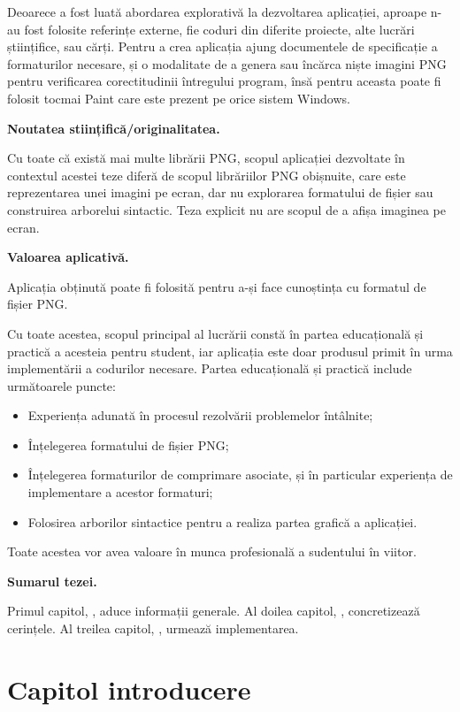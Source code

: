 \documentclass[a4paper,12pt]{report}
\begin{document}
Deoarece a fost luată abordarea explorativă la dezvoltarea aplicației,
aproape n-au fost folosite referințe externe,
fie coduri din diferite proiecte, alte lucrări științifice, sau cărți.
Pentru a crea aplicația ajung documentele de specificație a formaturilor necesare,
și o modalitate de a genera sau încărca niște imagini \ac{PNG}
pentru verificarea corectitudinii întregului program,
însă pentru aceasta poate fi folosit tocmai Paint care este prezent pe orice sistem Windows.

\textbf{Noutatea stiințifică/originalitatea.}

Cu toate că există mai multe librării \ac{PNG},
scopul aplicației dezvoltate în contextul acestei teze diferă de scopul librăriilor \ac{PNG} obișnuite,
care este reprezentarea unei imagini pe ecran,
dar nu explorarea formatului de fișier sau construirea arborelui sintactic.
Teza explicit nu are scopul de a afișa imaginea pe ecran.

\textbf{Valoarea aplicativă.}

Aplicația obținută poate fi folosită pentru a-și face cunoștința cu formatul de fișier \ac{PNG}.

Cu toate acestea, scopul principal al lucrării constă
în partea educațională și practică a acesteia pentru student,
iar aplicația este doar produsul primit în urma implementării a codurilor necesare.
Partea educațională și practică include următoarele puncte:
\begin{itemize}
    \item Experiența adunată în procesul rezolvării problemelor întâlnite;
    \item Înțelegerea formatului de fișier \ac{PNG};
    \item
        Înțelegerea formaturilor de comprimare asociate,
        și în particular experiența de implementare a acestor formaturi;
    \item Folosirea arborilor sintactice pentru a realiza partea grafică a aplicației.
\end{itemize}

Toate acestea vor avea valoare în munca profesională a sudentului în viitor.


\textbf{Sumarul tezei.}

Primul capitol, , aduce informații generale.
Al doilea capitol, , concretizează cerințele.
Al treilea capitol, , urmează implementarea.


\chapter{Capitol introducere}\label{intro_chapter_title}
\end{document}
